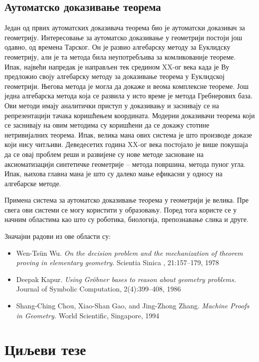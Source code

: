\documentclass[11pt]{article}
\newcommand{\lat}{}
\begin{document}
\subsection{Аутоматско доказивање теорема}

Један од првих аутоматских доказивача теорема био је аутоматски
доказивач за геометрију. Интересовање за аутоматско доказивање у
геометрији постоји још одавно, од времена Тарског. Он је развио
алгебарску методу за Еуклидску геометрију, али је та метода била
неупотребљива за комликованије теореме. Ипак, највећи напредак је
направљен тек средином XX-ог века када је Ву предложио своју
алгебарску методу за доказивање теорема у Еуклидској
геометрији. Његова метода је могла да докаже и веома комплексне
теореме. Још једна алгебарска метода која се развила у исто време је
метода Гребнерових база. Ови методи имају аналитички приступ у
доказивању и заснивају се на репрезентацији тачака коришћењем
координата. Мо\-де\-рни доказивачи теорема који се заснивају на овим
методима су коришћени да се докажу стотине нетривијалних
теорема. Ипак, велика мана ових система је што производе доказе који
нису читљиви. Деведесетих година XX-ог века постојало је више покушаја
да се овај проблем реши и развијене су нове методе засноване на
аксиоматизацији синтетичке геометрије -- метода површина, метода пуног
угла. Ипак, њихова главна мана је што су далеко мање ефикасни у односу
на алгебарске методе.

Примена система за аутоматско доказивање теорема у геометрији је
велика. Пре свега ови системи се могу користити у образовању. Поред
тога користе се у начним областима као што су роботика, биологија,
препознавање слика и друге.

Значајни радови из ове области су:
\begin{itemize}
\item {\lat Wen-Ts\"un Wu.  {\em On the decision problem and the  mechanization  of  theorem  proving  in  elementary  geometry.}
Scientia  Sinica ,  21:157--179, 1978}

\item {\lat Deepak Kapur. {\em Using Gr\"obner bases to reason about geometry problems.} Journal of Symbolic Computation, 2(4):399--408, 1986}

\item {\lat  Shang-Ching Chou, Xiao-Shan Gao, and Jing-Zhong  Zhang. {\em Machine  Proofs  in  Geometry.} World Scientific, Singapore, 1994}
\end{itemize}

\section{Циљеви тезе}
\end{document}

